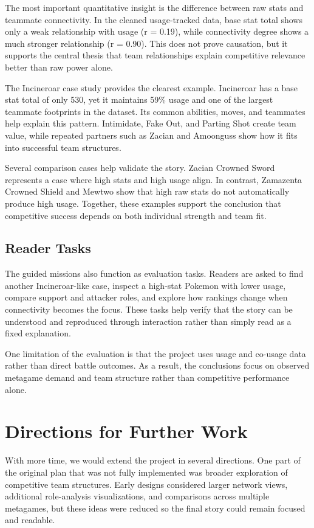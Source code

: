 \documentclass[11pt]{article}
\newcommand{\tightsection}[1]{\vspace{-0.25em}\section{#1}\vspace{-0.25em}}
\begin{document}
The most important quantitative insight is the difference between raw stats and teammate connectivity. In the cleaned usage-tracked data, base stat total shows only a weak relationship with usage (r = 0.19), while connectivity degree shows a much stronger relationship (r = 0.90). This does not prove causation, but it supports the central thesis that team relationships explain competitive relevance better than raw power alone.

The Incineroar case study provides the clearest example. Incineroar has a base stat total of only 530, yet it maintains 59\% usage and one of the largest teammate footprints in the dataset. Its common abilities, moves, and teammates help explain this pattern. Intimidate, Fake Out, and Parting Shot create team value, while repeated partners such as Zacian and Amoonguss show how it fits into successful team structures.

Several comparison cases help validate the story. Zacian Crowned Sword represents a case where high stats and high usage align. In contrast, Zamazenta Crowned Shield and Mewtwo show that high raw stats do not automatically produce high usage. Together, these examples support the conclusion that competitive success depends on both individual strength and team fit.

\subsection*{Reader Tasks}

The guided missions also function as evaluation tasks. Readers are asked to find another Incineroar-like case, inspect a high-stat Pokemon with lower usage, compare support and attacker roles, and explore how rankings change when connectivity becomes the focus. These tasks help verify that the story can be understood and reproduced through interaction rather than simply read as a fixed explanation.

One limitation of the evaluation is that the project uses usage and co-usage data rather than direct battle outcomes. As a result, the conclusions focus on observed metagame demand and team structure rather than competitive performance alone.

\tightsection{Directions for Further Work}
With more time, we would extend the project in several directions. One part of the original plan that was not fully implemented was broader exploration of competitive team structures. Early designs considered larger network views, additional role-analysis visualizations, and comparisons across multiple metagames, but these ideas were reduced so the final story could remain focused and readable.
\end{document}
